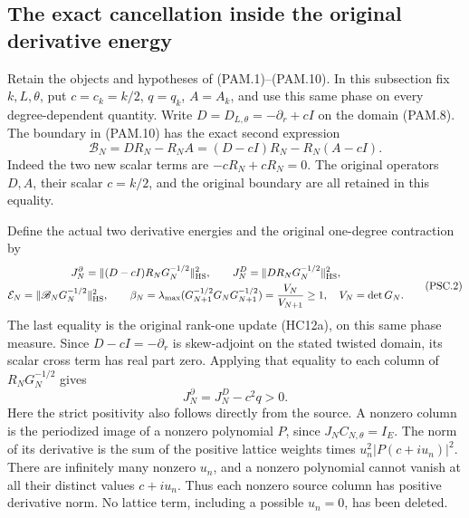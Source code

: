 \subsection{The exact cancellation inside the original derivative energy}
\label{sec:psc-centered}

Retain the objects and hypotheses of (PAM.1)--(PAM.10). In this
subsection fix \(k,L,\theta\), put \(c=c_k=k/2\), \(q=q_k\),
\(A=A_k\), and use this same phase on every degree-dependent
quantity. Write \(D=D_{L,\theta}=-\partial_r+cI\) on the domain
(PAM.8). The boundary in (PAM.10) has the exact second expression
\[
 \mathscr B_N=DR_N-R_NA
       =(D-cI)R_N-R_N(A-cI).
 \tag{PSC.1}\label{eq:psc-centeredboundary}
\]
Indeed the two new scalar terms are \(-cR_N+cR_N=0\).
The original operators \(D,A\), their scalar \(c=k/2\), and
the original boundary are all retained in this equality.

Define the actual two derivative energies and the original
one-degree contraction by
\[
 \begin{gathered}
 J_N^\partial=\|(D-cI)R_NG_N^{-1/2}\|_{\rm HS}^2,\qquad
 J_N^D=\|DR_NG_N^{-1/2}\|_{\rm HS}^2,\\
 \mathcal E_N=\|\mathscr B_NG_N^{-1/2}\|_{\rm HS}^2,\qquad
 \beta_N=\lambda_{\max}
       (G_{N+1}^{-1/2}G_NG_{N+1}^{-1/2})
       =\frac{V_N}{V_{N+1}}\ge1,\quad V_N=\det G_N .
 \end{gathered}
 \tag{PSC.2}\label{eq:psc-energies}
\]
The last equality is the original rank-one update (HC12a), on this
same phase measure. Since \(D-cI=-\partial_r\) is skew-adjoint
on the stated twisted domain, its scalar cross term has real part
zero. Applying that equality to each column of \(R_NG_N^{-1/2}\)
gives
\[
 J_N^\partial=J_N^D-c^2q>0 .
 \tag{PSC.3}\label{eq:psc-cancellation}
\]
Here the strict positivity also follows directly from the source.
A nonzero column is the periodized image of a nonzero polynomial
\(P\), since \(J_NC_{N,\theta}=I_E\).
The norm of its derivative is the sum of the positive lattice
weights times \(u_n^2|P(c+iu_n)|^2\).
There are infinitely many nonzero \(u_n\), and a nonzero polynomial
cannot vanish at all their distinct values \(c+iu_n\).
Thus each nonzero source column has positive derivative norm.
No lattice term, including a possible \(u_n=0\), has been deleted.

